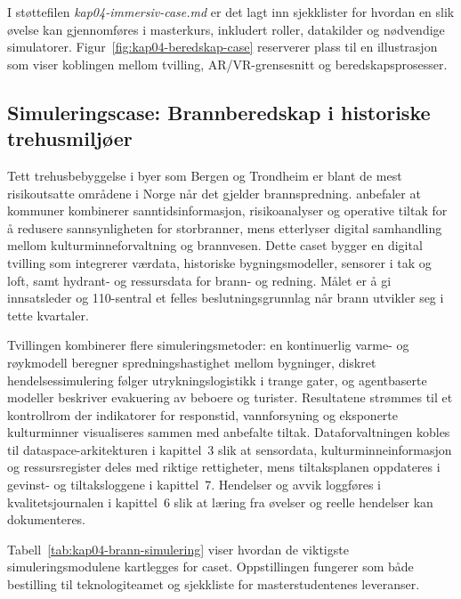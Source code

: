 I støttefilen \textit{kap04-immersiv-case.md} er det lagt inn sjekklister for hvordan en slik øvelse kan gjennomføres i masterkurs, inkludert roller, datakilder og nødvendige simulatorer. Figur~\ref{fig:kap04-beredskap-case} reserverer plass til en illustrasjon som viser koblingen mellom tvilling, AR/VR-grensesnitt og beredskapsprosesser.

\subsection{Simuleringscase: Brannberedskap i historiske trehusmiljøer}
Tett trehusbebyggelse i byer som Bergen og Trondheim er blant de mest risikoutsatte områdene i Norge når det gjelder brannspredning. \citet{dsb2021trehus} anbefaler at kommuner kombinerer sanntidsinformasjon, risikoanalyser og operative tiltak for å redusere sannsynligheten for storbranner, mens \citet{riksantikvaren2020trehus} etterlyser digital samhandling mellom kulturminneforvaltning og brannvesen. Dette caset bygger en digital tvilling som integrerer værdata, historiske bygningsmodeller, sensorer i tak og loft, samt hydrant- og ressursdata for brann- og redning. Målet er å gi innsatsleder og 110-sentral et felles beslutningsgrunnlag når brann utvikler seg i tette kvartaler.

Tvillingen kombinerer flere simuleringsmetoder: en kontinuerlig varme- og røykmodell beregner spredningshastighet mellom bygninger, diskret hendelsessimulering følger utrykningslogistikk i trange gater, og agentbaserte modeller beskriver evakuering av beboere og turister. Resultatene strømmes til et kontrollrom der indikatorer for responstid, vannforsyning og eksponerte kulturminner visualiseres sammen med anbefalte tiltak. Dataforvaltningen kobles til dataspace-arkitekturen i kapittel~3 slik at sensordata, kulturminneinformasjon og ressursregister deles med riktige rettigheter, mens tiltaksplanen oppdateres i gevinst- og tiltaksloggene i kapittel~7. Hendelser og avvik loggføres i kvalitetsjournalen i kapittel~6 slik at læring fra øvelser og reelle hendelser kan dokumenteres.

Tabell~\ref{tab:kap04-brann-simulering} viser hvordan de viktigste simuleringsmodulene kartlegges for caset. Oppstillingen fungerer som både bestilling til teknologiteamet og sjekkliste for masterstudentenes leveranser.

